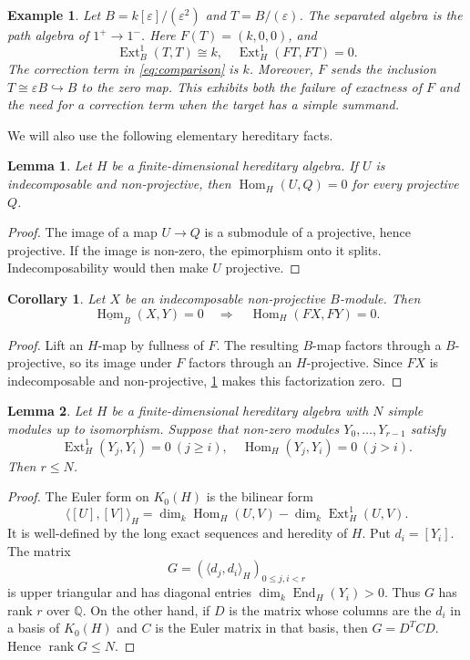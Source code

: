 \documentclass[a4paper,reqno]{amsart}
\numberwithin{equation}{section}
\newtheorem{lemma}[lemma]{Lemma}
\newtheorem{corollary}[corollary]{Corollary}
\newtheorem{example}[example]{Example}
\newcommand{\Ext}{\operatorname{Ext}}
\newcommand{\Hom}{\operatorname{Hom}}
\newcommand{\End}{\operatorname{End}}
\newcommand{\stableHom}{\underline{\Hom}}
\begin{document}
\begin{example}\label{ex:nonexact}
Let $B=k[\varepsilon]/(\varepsilon^2)$ and $T=B/(\varepsilon)$.
The separated algebra is the path algebra of $1^+\to1^-$. Here
$F(T)=(k,0,0)$, and
\[
 \Ext_B^1(T,T)\cong k,
 \quad \Ext_H^1(FT,FT)=0.
\]
The correction term in \eqref{eq:comparison} is $k$. Moreover, $F$
sends the inclusion $T\cong\varepsilon B\hookrightarrow B$ to the
zero map. This exhibits both the failure of exactness of $F$ and the
need for a correction term when the target has a simple summand.
\end{example}

We will also use the following elementary hereditary facts.

\begin{lemma}\label{lem:projective-maps}
Let $H$ be a finite-dimensional hereditary algebra. If $U$ is
indecomposable and non-projective, then $\Hom_H(U,Q)=0$ for every
projective $Q$.
\end{lemma}

\begin{proof}
The image of a map $U\to Q$ is a submodule of a projective, hence
projective. If the image is non-zero, the epimorphism onto it splits.
Indecomposability would then make $U$ projective.
\end{proof}

\begin{corollary}\label{cor:hom-transfer}
Let $X$ be an indecomposable non-projective $B$-module. Then
\[
 \stableHom_B(X,Y)=0\quad\Longrightarrow\quad\Hom_H(FX,FY)=0.
\]
\end{corollary}

\begin{proof}
Lift an $H$-map by fullness of $F$. The resulting $B$-map factors
through a $B$-projective, so its image under $F$ factors through an
$H$-projective. Since $FX$ is indecomposable and non-projective,
\cref{lem:projective-maps} makes this factorization zero.
\end{proof}

\begin{lemma}\label{lem:rank}
Let $H$ be a finite-dimensional hereditary algebra with $N$ simple
modules up to isomorphism. Suppose that non-zero modules
$Y_0,\ldots,Y_{r-1}$ satisfy
\[
 \Ext_H^1(Y_j,Y_i)=0~(j\ge i),
 \quad\Hom_H(Y_j,Y_i)=0~(j>i).
\]
Then $r\le N$.
\end{lemma}

\begin{proof}
The Euler form on $K_0(H)$ is the bilinear form
\[
 \langle[U],[V]\rangle_H=
 \dim_k\Hom_H(U,V)-\dim_k\Ext_H^1(U,V).
\]
It is well-defined by the long exact sequences and heredity of $H$.
Put $d_i=[Y_i]$. The matrix
\[
 G=(\langle d_j,d_i\rangle_H)_{0\le j,i<r}
\]
is upper triangular and has diagonal entries
$\dim_k\End_H(Y_i)>0$. Thus $G$ has rank $r$ over $\mathbb Q$.
On the other hand, if $D$ is the matrix whose columns are the $d_i$
in a basis of $K_0(H)$ and $C$ is the Euler matrix in that basis,
then $G=D^TCD$. Hence $\operatorname{rank}G\le N$.
\end{proof}
\end{document}
